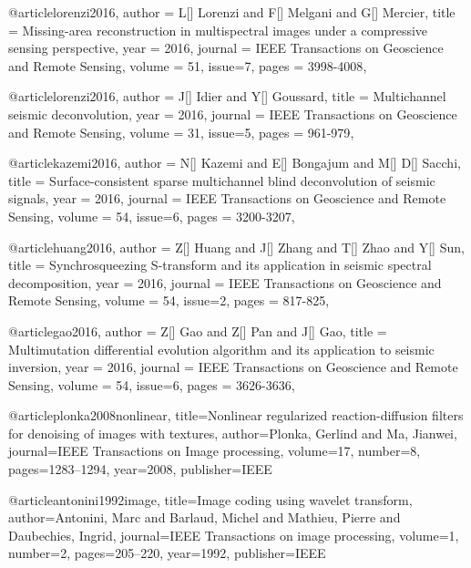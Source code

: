 @article{lorenzi2016,
  author =	 {L[] Lorenzi and F[] Melgani and G[] Mercier},
  title =	 {Missing-area reconstruction in multispectral images under a compressive sensing perspective},
  year =	 2016,
  journal =	 {IEEE Transactions on Geoscience and Remote Sensing},
  volume =	 51,
  issue=7,
  pages =	 {3998-4008},
}

@article{lorenzi2016,
  author =	 {J[] Idier and Y[] Goussard},
  title =	 {Multichannel seismic deconvolution},
  year =	 2016,
  journal =	 {IEEE Transactions on Geoscience and Remote Sensing},
  volume =	 31,
  issue=5,
  pages =	 {961-979},
}

@article{kazemi2016,
  author =	 {N[] Kazemi and E[] Bongajum and M[] D[] Sacchi},
  title =	 {Surface-consistent sparse multichannel blind deconvolution of seismic signals},
  year =	 2016,
  journal =	 {IEEE Transactions on Geoscience and Remote Sensing},
  volume =	 54,
  issue=6,
  pages =	 {3200-3207},
}

@article{huang2016,
  author =	 {Z[] Huang and J[] Zhang and T[] Zhao and Y[] Sun},
  title =	 {Synchrosqueezing {S}-transform and its application in seismic spectral decomposition},
  year =	 2016,
  journal =	 {IEEE Transactions on Geoscience and Remote Sensing},
  volume =	 54,
  issue=2,
  pages =	 {817-825},
}

@article{gao2016,
  author =	 {Z[] Gao and Z[] Pan and J[] Gao},
  title =	 {Multimutation differential evolution algorithm and its application to seismic inversion},
  year =	 2016,
  journal =	 {IEEE Transactions on Geoscience and Remote Sensing},
  volume =	 54,
  issue=6,
  pages =	 {3626-3636},
}


@article{plonka2008nonlinear,
  title={Nonlinear regularized reaction-diffusion filters for denoising of images with textures},
  author={Plonka, Gerlind and Ma, Jianwei},
  journal={IEEE Transactions on Image processing},
  volume={17},
  number={8},
  pages={1283--1294},
  year={2008},
  publisher={IEEE}
}

@article{antonini1992image,
  title={Image coding using wavelet transform},
  author={Antonini, Marc and Barlaud, Michel and Mathieu, Pierre and Daubechies, Ingrid},
  journal={IEEE Transactions on image processing},
  volume={1},
  number={2},
  pages={205--220},
  year={1992},
  publisher={IEEE}
}

